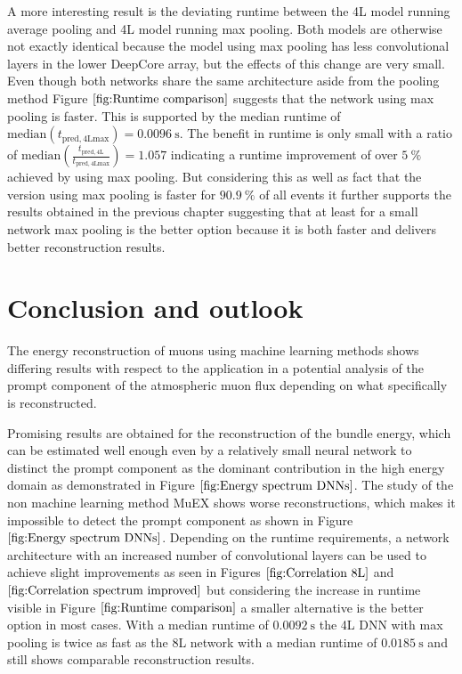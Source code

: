 \documentclass[
  tucolor,       %
  BCOR=12mm,     %
  parskip=half,  %
  open=any,      %
  cleardoublepage=plain,  %
]{tudothesis}
\begin{document}
A more interesting result is the deviating runtime between the 4L model running average pooling and 4L model running max pooling. Both models are otherwise not exactly identical because the model using max pooling has less convolutional layers in the lower DeepCore array, but the effects of this change are very small. Even though both networks share the same architecture aside from the pooling method Figure $\ref{fig:Runtime comparison}$ suggests that the network using max pooling is faster.
This is supported by the median runtime of $\mathrm{median}(t_{\mathrm{pred,4Lmax}})=\SI{0.0096}{\second}$. The benefit in runtime is only small with a ratio of $\mathrm{median}\left(\frac{t_{\mathrm{pred,4L}}}{t_{\mathrm{pred,4Lmax}}}\right)=\num{1.057}$ indicating a runtime improvement of over $\SI{5}{\percent}$ achieved by using max pooling.
But considering this as well as fact that the version using max pooling is faster for $\SI{90.9}{\percent}$ of all events it further supports the results obtained in the previous chapter suggesting that at least for a small network max pooling is the better option because it is both faster and delivers better reconstruction results.

\chapter{Conclusion and outlook}
The energy reconstruction of muons using machine learning methods shows differing results with respect to the application in a potential analysis of the prompt component of the atmospheric muon flux depending on what specifically is reconstructed.

Promising results are obtained for the reconstruction of the bundle energy, which can be estimated well enough even by a relatively small neural network to distinct the prompt component as the dominant contribution in the high energy domain as demonstrated in Figure $\ref{fig:Energy spectrum DNNs}$. 
The study of the non machine learning method MuEX shows worse reconstructions, which makes it impossible to detect the prompt component as shown in Figure $\ref{fig:Energy spectrum DNNs}$.
Depending on the runtime requirements, a network architecture with an increased number of convolutional layers can be used to achieve slight improvements as seen in Figures $\ref{fig:Correlation 8L}$ and $\ref{fig:Correlation spectrum improved}$ but considering the increase in runtime visible in Figure $\ref{fig:Runtime comparison}$ a smaller alternative is the better option in most cases.
With a median runtime of $\SI{0.0092}{\second}$ the 4L DNN with max pooling is twice as fast as the 8L network with a median runtime of $\SI{0.0185}{\second}$ and still shows comparable reconstruction results. 
\end{document}
